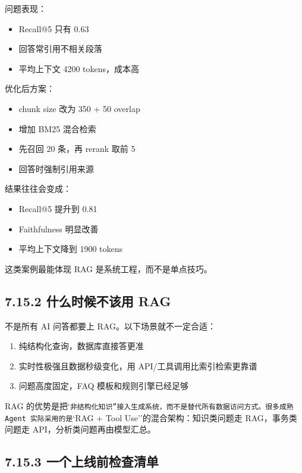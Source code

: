 问题表现：


\begin{itemize}[leftmargin=2em]
\item Recall@5 只有 0.63
\item 回答常引用不相关段落
\item 平均上下文 4200 tokens，成本高
\end{itemize}

优化后方案：


\begin{itemize}[leftmargin=2em]
\item chunk size 改为 350 + 50 overlap
\item 增加 BM25 混合检索
\item 先召回 20 条，再 rerank 取前 5
\item 回答时强制引用来源
\end{itemize}

结果往往会变成：


\begin{itemize}[leftmargin=2em]
\item Recall@5 提升到 0.81
\item Faithfulness 明显改善
\item 平均上下文降到 1900 tokens
\end{itemize}

这类案例最能体现 RAG 是系统工程，而不是单点技巧。


\subsection{7.15.2 什么时候不该用 RAG}

不是所有 AI 问答都要上 RAG。以下场景就不一定合适：


\begin{enumerate}[leftmargin=2em]
\item 纯结构化查询，数据库直接答更准
\item 实时性极强且数据秒级变化，用 API/工具调用比索引检索更靠谱
\item 问题高度固定，FAQ 模板和规则引擎已经足够
\end{enumerate}

RAG 的优势是把`\texttt{非结构化知识''接入生成系统，而不是替代所有数据访问方式。很多成熟 Agent 实际采用的是}`RAG + Tool Use''的混合架构：知识类问题走 RAG，事务类问题走 API，分析类问题再由模型汇总。


\subsection{7.15.3 一个上线前检查清单}

